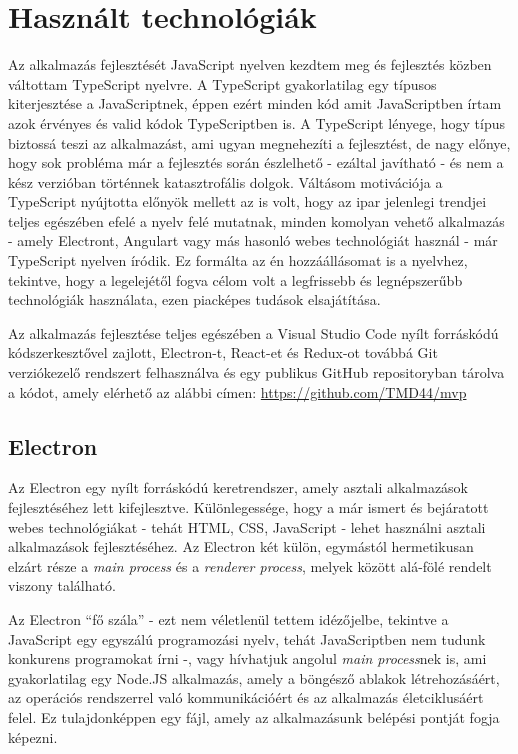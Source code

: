 \section{Használt technológiák}
Az alkalmazás fejlesztését JavaScript nyelven kezdtem meg és fejlesztés közben váltottam TypeScript nyelvre. A TypeScript gyakorlatilag egy típusos kiterjesztése a JavaScriptnek, éppen ezért minden kód amit JavaScriptben írtam azok érvényes és valid kódok TypeScriptben is. A TypeScript lényege, hogy típus biztossá teszi az alkalmazást, ami ugyan megnehezíti a fejlesztést, de nagy előnye, hogy sok probléma már a fejlesztés során észlelhető - ezáltal javítható - és nem a kész verzióban történnek katasztrofális dolgok. Váltásom motivációja a TypeScript nyújtotta előnyök mellett az is volt, hogy az ipar jelenlegi trendjei teljes egészében efelé a nyelv felé mutatnak, minden komolyan vehető alkalmazás - amely Electront, Angulart vagy más hasonló webes technológiát használ - már TypeScript nyelven íródik. Ez formálta az én hozzáállásomat is a nyelvhez, tekintve, hogy a legelejétől fogva célom volt a legfrissebb és legnépszerűbb technológiák használata, ezen piacképes tudások elsajátítása.

Az alkalmazás fejlesztése teljes egészében a Visual Studio Code nyílt forráskódú kódszerkesztővel zajlott, Electron-t, React-et és Redux-ot továbbá Git verziókezelő rendszert felhasználva és egy publikus GitHub repositoryban tárolva a kódot, amely elérhető az alábbi címen: \url{https://github.com/TMD44/mvp}\cite{github}

\subsection{Electron}
Az Electron\cite{electron} egy nyílt forráskódú keretrendszer, amely asztali alkalmazások fejlesztéséhez lett kifejlesztve. Különlegessége, hogy a már ismert és bejáratott webes technológiákat - tehát HTML, CSS, JavaScript - lehet használni asztali alkalmazások fejlesztéséhez. Az Electron két külön, egymástól hermetikusan elzárt része a {\it main process} és a {\it renderer process}, melyek között alá-fölé rendelt viszony található.

Az Electron ``fő szála'' - ezt nem véletlenül tettem idézőjelbe, tekintve a JavaScript egy egyszálú programozási nyelv, tehát JavaScriptben nem tudunk konkurens programokat írni -, vagy hívhatjuk angolul {\it main process}nek is, ami gyakorlatilag egy Node.JS alkalmazás, amely a böngésző ablakok létrehozásáért, az operációs rendszerrel való kommunikációért és az alkalmazás életciklusáért felel. Ez tulajdonképpen egy fájl, amely az alkalmazásunk belépési pontját fogja képezni.

